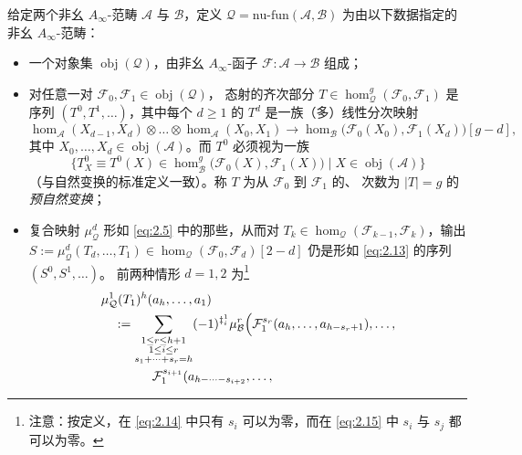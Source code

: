 \begin{Def}\label{def:2.10}
给定两个非幺 $A_\infty$-范畴 $\mathcal A$ 与 $\mathcal B$，定义
$\mathcal Q=\mathrm{nu\text{-}fun}(\mathcal A,\mathcal B)$ 为由以下数据指定的非幺
$A_\infty$-范畴：
\begin{itemize}
  \item 一个对象集 $\operatorname{obj}(\mathcal Q)$，由非幺 $A_\infty$-函子
        $\mathcal F:\mathcal A\to\mathcal B$ 组成；
  \item 对任意一对 $\mathcal F_0,\mathcal F_1\in\operatorname{obj}(\mathcal Q)$，
        态射的齐次部分 $T\in\hom^g_{\mathcal Q}(\mathcal F_0,\mathcal F_1)$ 是序列
        $(T^0,T^1,\dots)$，其中每个 $d\ge 1$ 的 $T^d$ 是一族（多）线性分次映射
        \begin{equation}\label{eq:2.13}
          \hom_{\mathcal A}(X_{d-1},X_d)\otimes\dots\otimes
          \hom_{\mathcal A}(X_0,X_1)\longrightarrow
          \hom_{\mathcal B}\bigl(\mathcal F_0(X_0),\mathcal F_1(X_d)\bigr)[g-d],
        \end{equation}
        其中 $X_0,\dots,X_d\in\operatorname{obj}(\mathcal A)$。而 $T^0$ 必须视为一族
        \[
          \bigl\{T^0_X\equiv T^0(X)\in\hom^g_{\mathcal B}\bigl(\mathcal F_0(X),
          \mathcal F_1(X)\bigr)\mid X\in\operatorname{obj}(\mathcal A)\bigr\}
        \]
        （与自然变换的标准定义一致）。称 $T$ 为从 $\mathcal F_0$ 到 $\mathcal F_1$ 的、
        次数为 $|T|=g$ 的\emph{预自然变换}；
  \item 复合映射 $\mu^d_{\mathcal Q}$ 形如 \eqref{eq:2.5} 中的那些，从而对
        $T_k\in\hom_{\mathcal Q}(\mathcal F_{k-1},\mathcal F_k)$，输出
        $S:=\mu^d_{\mathcal Q}(T_d,\dots,T_1)\in\hom_{\mathcal Q}(\mathcal F_0,
        \mathcal F_d)[2-d]$ 仍是形如 \eqref{eq:2.13} 的序列 $(S^0,S^1,\dots)$。
        前两种情形 $d=1,2$ 为\footnote{注意：按定义，在 \eqref{eq:2.14} 中只有 $s_i$
        可以为零，而在 \eqref{eq:2.15} 中 $s_i$ 与 $s_j$ 都可以为零。}
        \begin{equation}\label{eq:2.14}
          \begin{aligned}
            &\mu^1_{\mathcal Q}(T_1)^h(a_h,\dots,a_1)\\
            &\quad:=\sum_{\substack{1\le r\le h+1\\ 1\le i\le r\\ s_1+\dots+s_r=h}}
            (-1)^{\ddagger^1_i}\mu^r_{\mathcal B}\Bigl(
            \mathcal F_1^{s_r}(a_h,\dots,a_{h-s_r+1}),\dots,\\
            &\qquad\qquad \mathcal F_1^{s_{i+1}}(a_{h-\dots-s_{i+2}},\dots,

\end{aligned}
\end{equation}
\end{itemize}
\end{Def}
